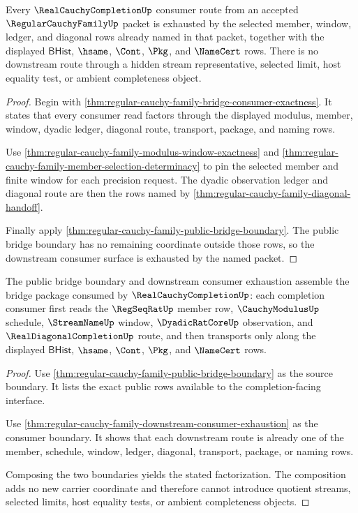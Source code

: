 \begin{theorem}
\label{thm:regular-cauchy-family-downstream-consumer-exhaustion}
Every $\RealCauchyCompletionUp$ consumer route from an accepted $\RegularCauchyFamilyUp$ packet is exhausted by the selected member, window, ledger, and diagonal rows already named in that packet, together with the displayed $\mathsf{BHist}$, $\hsame$, $\Cont$, $\Pkg$, and $\NameCert$ rows. There is no downstream route through a hidden stream representative, selected limit, host equality test, or ambient completeness object.
\end{theorem}
\begin{proof}
Begin with \autoref{thm:regular-cauchy-family-bridge-consumer-exactness}. It states that every consumer read factors through the displayed modulus, member, window, dyadic ledger, diagonal route, transport, package, and naming rows.

Use \autoref{thm:regular-cauchy-family-modulus-window-exactness} and \autoref{thm:regular-cauchy-family-member-selection-determinacy} to pin the selected member and finite window for each precision request. The dyadic observation ledger and diagonal route are then the rows named by \autoref{thm:regular-cauchy-family-diagonal-handoff}.

Finally apply \autoref{thm:regular-cauchy-family-public-bridge-boundary}. The public bridge boundary has no remaining coordinate outside those rows, so the downstream consumer surface is exhausted by the named packet.
\end{proof}

\begin{theorem}
\label{thm:regular-cauchy-family-completion-consumer-factorization}
The public bridge boundary and downstream consumer exhaustion assemble the bridge package consumed by $\RealCauchyCompletionUp$: each completion consumer first reads the $\RegSeqRatUp$ member row, $\CauchyModulusUp$ schedule, $\StreamNameUp$ window, $\DyadicRatCoreUp$ observation, and $\RealDiagonalCompletionUp$ route, and then transports only along the displayed $\mathsf{BHist}$, $\hsame$, $\Cont$, $\Pkg$, and $\NameCert$ rows.
\end{theorem}
\begin{proof}
Use \autoref{thm:regular-cauchy-family-public-bridge-boundary} as the source boundary. It lists the exact public rows available to the completion-facing interface.

Use \autoref{thm:regular-cauchy-family-downstream-consumer-exhaustion} as the consumer boundary. It shows that each downstream route is already one of the member, schedule, window, ledger, diagonal, transport, package, or naming rows.

Composing the two boundaries yields the stated factorization. The composition adds no new carrier coordinate and therefore cannot introduce quotient streams, selected limits, host equality tests, or ambient completeness objects.
\end{proof}

